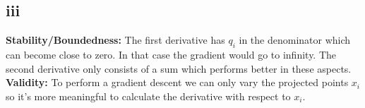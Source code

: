 \subsection*{iii}
\textbf{Stability/Boundedness:} The first derivative has $q_i$ in the denominator which can become close to zero.
In that case the gradient would go to infinity.
The second derivative only consists of a sum which performs better in these aspects. \\
\textbf{Validity:} To perform a gradient descent we can only vary the projected points $x_i$ so it's more meaningful to calculate the derivative with respect to $x_i$.

\clearpage
